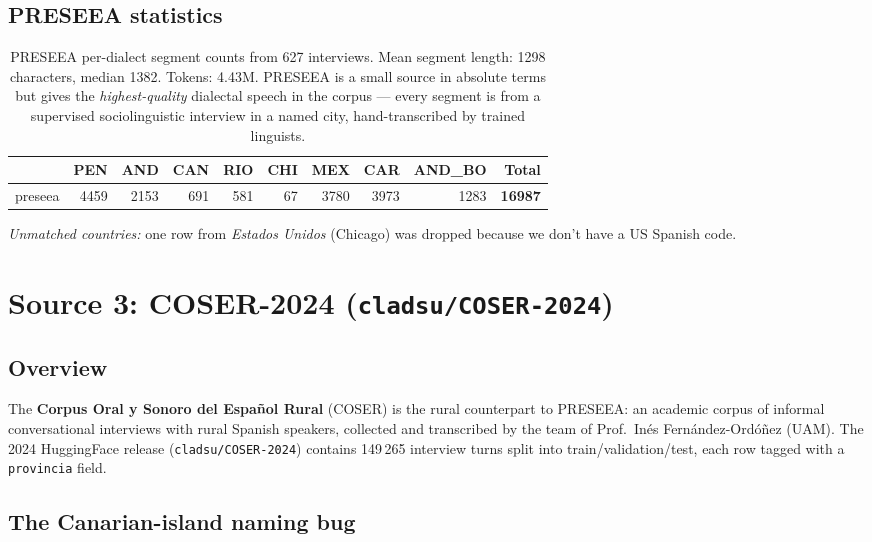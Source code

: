 \documentclass[11pt,a4paper]{article}
\begin{document}
\subsection{PRESEEA statistics}

\begin{table}[h]
\centering
\begin{tabular}{l r r r r r r r r r}
\toprule
 & \textbf{PEN} & \textbf{AND} & \textbf{CAN} & \textbf{RIO} & \textbf{CHI} & \textbf{MEX} & \textbf{CAR} & \textbf{AND\_BO} & \textbf{Total} \\
\midrule
preseea & \num{4459} & \num{2153} & \num{691} & \num{581} & \num{67} & \num{3780} & \num{3973} & \num{1283} & \textbf{\num{16987}} \\
\bottomrule
\end{tabular}
\caption{PRESEEA per-dialect segment counts from 627 interviews. Mean
segment length: 1298 characters, median 1382. Tokens: 4.43M. PRESEEA is
a small source in absolute terms but gives the \emph{highest-quality}
dialectal speech in the corpus --- every segment is from a supervised
sociolinguistic interview in a named city, hand-transcribed by trained
linguists.}
\label{tab:preseea-stats}
\end{table}

\emph{Unmatched countries:} one row from \emph{Estados Unidos} (Chicago)
was dropped because we don't have a US Spanish code.

\section{Source 3: COSER-2024 (\texttt{cladsu/COSER-2024})}

\subsection{Overview}

The \textbf{Corpus Oral y Sonoro del Español Rural} (COSER) is the rural
counterpart to PRESEEA: an academic corpus of informal conversational
interviews with rural Spanish speakers, collected and transcribed by the
team of Prof.\ Inés Fernández-Ordóñez (UAM). The 2024 HuggingFace release
(\texttt{cladsu/COSER-2024}) contains 149\,265 interview turns split into
train/validation/test, each row tagged with a \texttt{provincia} field.

\subsection{The Canarian-island naming bug}
\end{document}
